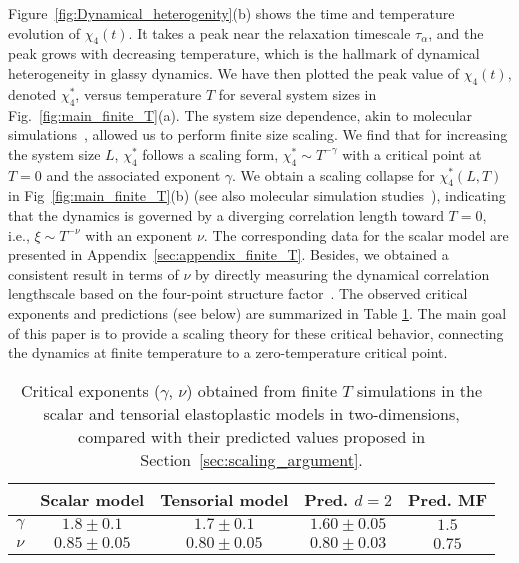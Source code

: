 \documentclass[pre,twocolumn,superscriptaddress,tightenlines,showpacs,longbibliography,floatfix,footinbib]{revtex4-1}
\begin{document}
Figure~\ref{fig:Dynamical_heterogenity}(b) shows the time and temperature evolution of $\chi_4(t)$. It takes a peak near the relaxation timescale $\tau_\alpha$, and the peak grows with decreasing temperature, which is the hallmark of dynamical heterogeneity in glassy dynamics. We have then plotted the peak value of $\chi_4(t)$, denoted $\chi_4^*$, versus temperature $T$ for several system sizes in Fig.~\ref{fig:main_finite_T}(a). The system size dependence, akin to molecular simulations~\cite{karmakar2009growing,chakrabarty2017block}, allowed us to perform finite size scaling. We find that for increasing the system size $L$, $\chi_4^*$ follows a scaling form,
$\chi_4^* \sim T^{-\gamma}$ with a critical point at $T=0$ and the associated exponent $\gamma$. We obtain a scaling collapse for $\chi_4^*(L, T)$ in Fig~\ref{fig:main_finite_T}(b) (see also molecular simulation studies~\cite{karmakar2009growing,chakrabarty2017block}), indicating that the dynamics is governed by a diverging correlation length toward $T=0$, i.e., $\xi \sim T^{-\nu}$ with an exponent $\nu$.
The corresponding data for the scalar model are presented in Appendix~\ref{sec:appendix_finite_T}. Besides, we obtained a consistent result in terms of $\nu$ by directly measuring the dynamical correlation lengthscale based on the four-point structure factor~\cite{lavcevic2003spatially}.
The observed critical exponents and predictions (see below) are summarized in Table \ref{tab:critical_exponents_finite_T}.
The main goal of this paper is to provide a scaling theory for these critical behavior, connecting the dynamics at finite temperature to a zero-temperature critical point.


\begin{table}
\begin{ruledtabular}
\caption{Critical exponents ($\gamma$, $\nu$) obtained from finite $T$ simulations in the scalar and tensorial elastoplastic models in two-dimensions, compared with their predicted values proposed in Section~\ref{sec:scaling_argument}.}
\label{tab:critical_exponents_finite_T}
\begin{tabular}{c|cccc}
&Scalar model & Tensorial model & Pred. $d=2$ & Pred. MF
\\ \hline 
$\gamma$ & $1.8 \pm 0.1$  & $1.7 \pm 0.1$ & $1.60 \pm 0.05$ & $1.5$\\
$\nu$& $0.85 \pm 0.05$  & $0.80 \pm 0.05$ &$0.80 \pm 0.03$  & $0.75$ \\
\end{tabular}
\end{ruledtabular}
\end{table}
\end{document}
